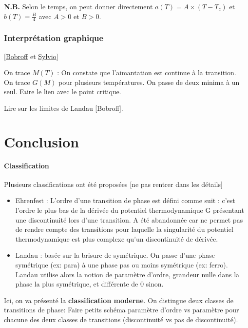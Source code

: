 \documentclass[11pt]{report}
\numberwithin{figure}{section}
\numberwithin{equation}{section}
\numberwithin{table}{section}
\newcommand{\1}{\boldsymbol{1}}
\begin{document}
\textbf{N.B.} Selon le temps, on peut donner directement $a(T) = A \times (T-T_c)$ et $b(T) = \frac{B}{4}$ avec $A>0$ et $B>0$.

\subsubsection{Interprétation graphique}

[\href{http://hebergement.u-psud.fr/rmn/thermo/thermo_pdf/coursThermo2013.pdf}{Bobroff} et \href{https://perso.ens-lyon.fr/sylvio.rossetti/AGREG/LP/LP15_Transition%20de%20phase/Transition_de_phase.pdf}{Sylvio}] 

On trace $M(T)$ : On constate que l’aimantation est continue à la transition. \\
On trace $G(M)$ pour plusieurs températures. On passe de deux minima à un seul. Faire le lien avec le point critique.

Lire sur les limites de Landau [Bobroff].

\section*{Conclusion}

\paragraph{Classification}

Plusieurs classifications ont été proposées [ne pas rentrer dans les détails]
\begin{itemize}
\item Ehrenfest : L’ordre d’une transition de phase est défini comme suit : c’est l’ordre le plus bas de la dérivée du potentiel thermodynamique G présentant une discontinuité lors d’une transition. A été abandonnée car ne permet pas de rendre compte  des transitions pour laquelle la singularité du potentiel thermodynamique est plus complexe qu’un discontinuité de dérivée.
\item Landau : basée sur la brisure de symétrique. On passe d'une phase symétrique (ex: para) à une phase pas ou moins symétrique (ex: ferro). Landau utilise alors la notion de paramètre d’ordre, grandeur nulle dans la phase la plus symétrique, et différente de 0 sinon. 
\end{itemize}

Ici, on va présenté la \textbf{classification moderne}. On distingue deux classes de transitions de phase: \textcolor{mycolor3}{Faire petits schéma paramètre d'ordre vs paramètre pour chacune des deux classes de transitions (discontinuité vs pas de discontinuité).}
\end{document}
